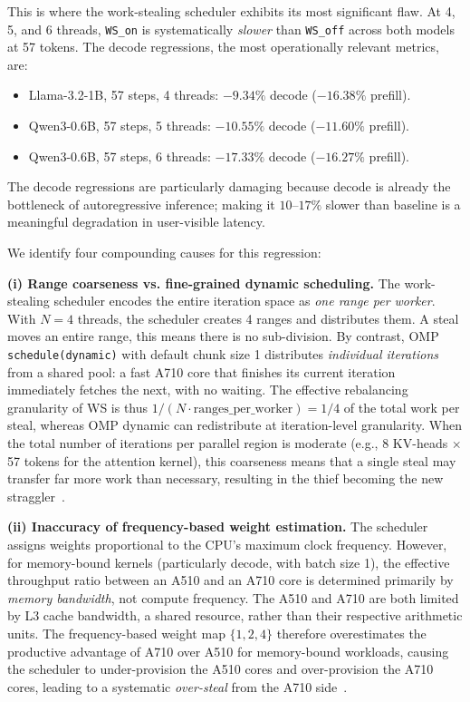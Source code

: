\documentclass[11pt,english]{article}
\begin{document}
This is where the work-stealing scheduler exhibits its most significant flaw. At 4, 5, and 6 threads, \texttt{WS\_on} is systematically \emph{slower} than \texttt{WS\_off} across both models at 57 tokens. The decode regressions, the most operationally relevant metrics, are:
 
\begin{itemize}
    \item Llama-3.2-1B, 57 steps, 4 threads: $\mathbf{-9.34\%}$ decode ($-16.38\%$ prefill).
    \item Qwen3-0.6B, 57 steps, 5 threads: $\mathbf{-10.55\%}$ decode ($-11.60\%$ prefill).
    \item Qwen3-0.6B, 57 steps, 6 threads: $\mathbf{-17.33\%}$ decode ($-16.27\%$ prefill).
\end{itemize}
 
The decode regressions are particularly damaging because decode is already the bottleneck of autoregressive inference; making it $10$--$17\%$ slower than baseline is a meaningful degradation in user-visible latency.
 
We identify four compounding causes for this regression:
 
\textbf{(i) Range coarseness vs. fine-grained dynamic scheduling.} The work-stealing scheduler encodes the entire iteration space as \emph{one range per worker}. With $N=4$ threads, the scheduler creates 4 ranges and distributes them. A steal moves an entire range, this means there is no sub-division. By contrast, OMP \texttt{schedule(dynamic)} with default chunk size 1 distributes \emph{individual iterations} from a shared pool: a fast A710 core that finishes its current iteration immediately fetches the next, with no waiting. The effective rebalancing granularity of WS is thus $1/(N \cdot \text{ranges\_per\_worker}) = 1/4$ of the total work per steal, whereas OMP dynamic can redistribute at iteration-level granularity. When the total number of iterations per parallel region is moderate (e.g., 8 KV-heads $\times$ 57 tokens for the attention kernel), this coarseness means that a single steal may transfer far more work than necessary, resulting in the thief becoming the new straggler~\cite{mishra2024cows}.
 
\textbf{(ii) Inaccuracy of frequency-based weight estimation.} The scheduler assigns weights proportional to the CPU's maximum clock frequency. However, for memory-bound kernels (particularly decode, with batch size 1), the effective throughput ratio between an A510 and an A710 core is determined primarily by \emph{memory bandwidth}, not compute frequency. The A510 and A710 are both limited by L3 cache bandwidth, a shared resource, rather than their respective arithmetic units. The frequency-based weight map $\{1, 2, 4\}$ therefore overestimates the productive advantage of A710 over A510 for memory-bound workloads, causing the scheduler to under-provision the A510 cores and over-provision the A710 cores, leading to a systematic \emph{over-steal} from the A710 side~\cite{dice2021transformercpu,jiang2022arm}.
 
\end{document}
